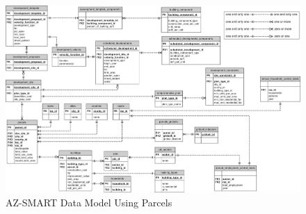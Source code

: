 \begin{figure}
\begin{center}
\includegraphics[scale=0.4]{../../datamodel/AZ-SMART_data_model_diagram_parcel_based.png}
\caption{AZ-SMART Data Model Using Parcels}
\label{figParcelDataModel}
\end{center}
\end{figure}
\clearpage
